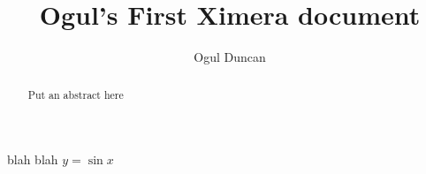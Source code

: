 \documentclass{ximera}
\title{Ogul's First Ximera document}
\author{Ogul Duncan}
\begin{document}
\begin{abstract}
    Put an abstract here
\end{abstract}


\maketitle
blah blah $y=\sin x$
\end{document}
